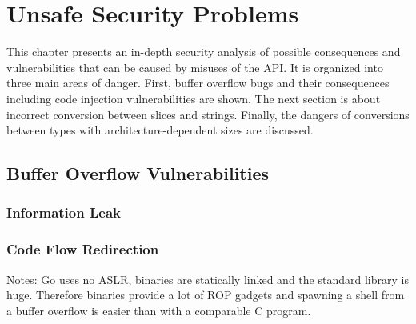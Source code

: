 
\chapter{Unsafe Security Problems}\label{ch:unsafe-security-problems}

This chapter presents an in-depth security analysis of possible consequences and vulnerabilities that can be caused by
misuses of the \unsafe{} \acrshort{API}.
It is organized into three main areas of danger.
First, buffer overflow bugs and their consequences including code injection vulnerabilities are shown.
The next section is about incorrect conversion between slices and strings.
Finally, the dangers of conversions between types with architecture-dependent sizes are discussed.





\section{Buffer Overflow Vulnerabilities}\label{sec:unsafe-security-problems:buffer-overflow}



\subsection{Information Leak}\label{subsec:unsafe-security-problems:buffer-overflow:information-leak}



\subsection{Code Flow Redirection}\label{subsec:unsafe-security-problems:buffer-overflow:code-flow-redirection}

Notes: Go uses no \acrshort{ASLR}, binaries are statically linked and the standard library is huge.
Therefore binaries provide a lot of ROP gadgets and spawning a shell from a buffer overflow is easier than with a
comparable C program.


